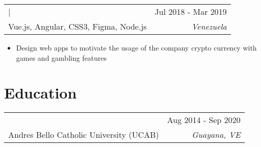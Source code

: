\documentclass[letterpaper,10.8pt]{article}
\makeatletter
\newcommand{\normalFont}[1]{\fontsize{9.5pt}{11pt}{\selectfont{#1}}}
\newcommand{\largeFont}[1]{\fontsize{11pt}{11pt}{\selectfont{#1}}}
\newcommand{\resumeItem}[2]{
  \item{
      { #2 \vspace{-3.4pt}}
    }
  }
\newcommand{\resumeSubheading}[5]{
    \begin{tabular*}{1\textwidth}{l@{\extracolsep{\fill}}r}
      \largeFont{\color{mypink1}\textbf{#1}} | \normalFont{#3} & \small{#4} \\
      {\normalFont{Stack: } #5} & \textit{\small #2} \\
    \end{tabular*}\vspace{-8pt}
  }
\newcommand{\educationSubheading}[4]{
    \begin{tabular*}{1\textwidth}{l@{\extracolsep{\fill}}r}
      \largeFont{\textbf{\color{mypink1}{#1}}} & \small{#4} \\
      {\small #3} & \textit{\small #2} \\
    \end{tabular*}\vspace{-5pt}
  }
\newcommand{\resumeItemListStart}{\begin{itemize}}
\newcommand{\resumeItemListEnd}{\end{itemize}\vspace{4pt}}
\makeatother
\begin{document}
\resumeSubheading
{Frontend Developer}{ Venezuela }
{Pintosoft}{ Jul 2018 - Mar 2019 }
{Vue.js, Angular, CSS3, Figma, Node.js}

\resumeItemListStart
\resumeItem{Crypto Gaming Web App Designer}
{Design web apps to motivate the usage of the company crypto currency with games and gambling features }
\resumeItemListEnd

\vspace{-8pt}
\section{Education}
\educationSubheading
{Bachelor of Computer Science}{Guayana, VE}
{Andres Bello Catholic University (UCAB)}{Aug 2014 - Sep 2020}
\end{document}
